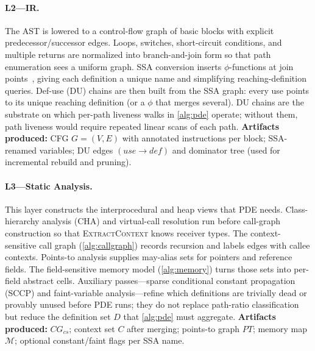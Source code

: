 \documentclass[acmsmall,screen,review,anonymous]{acmart}
\begin{document}
\paragraph{L2---IR.}
The AST is lowered to a control-flow graph of basic blocks with explicit predecessor/successor edges. Loops, switches, short-circuit conditions, and multiple returns are normalized into branch-and-join form so that path enumeration sees a uniform graph. SSA conversion inserts $\phi$-functions at join points~\cite{cytron1991efficient}, giving each definition a unique name and simplifying reaching-definition queries. Def-use (DU) chains are then built from the SSA graph: every use points to its unique reaching definition (or a $\phi$ that merges several). DU chains are the substrate on which per-path liveness walks in \autoref{alg:pde} operate; without them, path liveness would require repeated linear scans of each path.
\textbf{Artifacts produced:} CFG $G=(V,E)$ with annotated instructions per block; SSA-renamed variables; DU edges $(use\!\rightarrow\!def)$ and dominator tree (used for incremental rebuild and pruning).

\paragraph{L3---Static Analysis.}
This layer constructs the interprocedural and heap views that PDE needs. Class-hierarchy analysis (CHA) and virtual-call resolution run before call-graph construction so that \textsc{ExtractContext} knows receiver types. The context-sensitive call graph (\autoref{alg:callgraph}) records recursion and labels edges with callee contexts. Points-to analysis supplies may-alias sets for pointers and reference fields. The field-sensitive memory model (\autoref{alg:memory}) turns those sets into per-field abstract cells. Auxiliary passes---sparse conditional constant propagation (SCCP) and faint-variable analysis---refine which definitions are trivially dead or provably unused before PDE runs; they do not replace path-ratio classification but reduce the definition set $D$ that \autoref{alg:pde} must aggregate.
\textbf{Artifacts produced:} $CG_{cs}$; context set $C$ after merging; points-to graph $PT$; memory map $\mathcal{M}$; optional constant/faint flags per SSA name.
\end{document}
